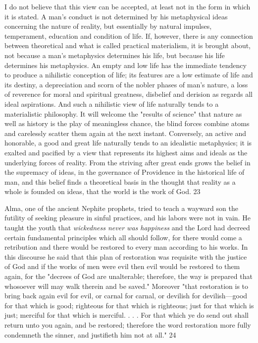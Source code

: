 I do not believe that this view can be accepted, at least not in the form in which it is stated. A
man's conduct is not determined by his metaphysical ideas concerning the nature of reality,
but essentially by natural impulses, temperament, education and condition of life. If,
however, there is any connection between theoretical and what is called practical
materialism, it is brought about, not because a man's metaphysics determines his life, but
because his life determines his metaphysics. An empty and low life has the immediate
tendency to produce a nihilistic conception of life; its features are a low estimate of life and
its destiny, a depreciation and scorn of the nobler phases of man's nature, a loss of reverence
for moral and spiritual greatness, disbelief and derision as regards all ideal aspirations. And
such a nihilistic view of life naturally tends to a materialistic philosophy. It will welcome the
"results of science" that nature as well as history is the play of meaningless chance, the blind
forces combine atoms and carelessly scatter them again at the next instant. Conversely, an
active and honorable, a good and great life naturally tends to an idealistic metaphysics; it is
exalted and pacified by a view that represents its highest aims and ideals as the underlying
forces of reality. From the striving after great ends grows the belief in the supremacy of
ideas, in the governance of Providence in the historical life of man, and this belief finds a
theoretical basis in the thought that reality as a whole is founded on ideas, that the world is
the work of God. 23

Alma, one of the ancient Nephite prophets, tried to teach a wayward son the futility of
seeking pleasure in sinful practices, and his labors were not in vain. He taught the youth that
\textit{wickedness never was happiness} and the Lord had decreed certain fundamental principles
which all should follow, for there would come a retribution and there would be restored to
every man according to his works. In this discourse he said that this plan of restoration was
requisite with the justice of God and if the works of men were evil then evil would be
restored to them again, for the "decrees of God are unalterable; therefore, the way is prepared
that whosoever will may walk therein and be saved." Moreover "that restoration is to bring
back again evil for evil, or carnal for carnal, or devilish for devilish—good for that which is
good; righteous for that which is righteous; just for that which is just; merciful for that which
is merciful. . . . For that which ye do send out shall return unto you again, and be restored;
therefore the word restoration more fully condemneth the sinner, and justifieth him not at
all." 24

